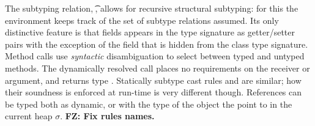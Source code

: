 \documentclass[acmlarge, anonymous, authordraft]{acmart}
\newcommand{\FZ}[1]{\textbf{FZ: #1}}
\begin{document}
The
subtyping relation, \StrSub\M\K\t\tp, allows for recursive structural
subtyping: for this the environment \M keeps track of the set of subtype relations assumed.  
Its only distinctive feature is that fields
appears in the type signature as getter/setter pairs with the exception of
the \that field that is hidden from the class type signature.  Method calls use \emph{syntactic} disambiguation to select between
typed and untyped methods. The dynamically resolved call places no
requirements on the receiver or argument, and returns type \any. 
Statically subtype cast rules  and  are similar; how their soundness is enforced at run-time is very different though.  References can be typed both as dynamic, or with the type of the object the point to in the current heap \(\sigma\).   \FZ{Fix rules names.}
\end{document}

